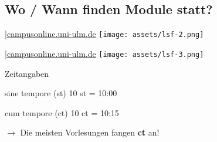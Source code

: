 \documentclass[
	aspectratio=169, 
	10pt 
]{beamer}
\newcommand*\annotatedFigureBoxCustom[8]{\draw[#5,thick,rounded corners] (#1) rectangle (#2);\node at (#4) [fill=#6,thick,shape=circle,draw=#7,inner sep=2pt,font=\sffamily,text=#8] {\textbf{#3}};}
\newcommand*\annotatedFigureBox[4]{\annotatedFigureBoxCustom{#1}{#2}{#3}{#4}{black}{white}{black}{black}}
\newenvironment {annotatedFigure}[1]{\centering\begin{tikzpicture}
    \node[anchor=south west,inner sep=0] (image) at (0,0) { #1};\begin{scope}[x={(image.south east)},y={(image.north west)}]}{\end{scope}\end{tikzpicture}}
\begin{document}
\subsection{Wo / Wann finden Module statt?}


\begin{frame}{\insertsubsection \space|\space\underline{\href{https://campusonline.uni-ulm.de}{campusonline.uni-ulm.de}}}
    \texttt{[image: assets/lsf-2.png]}
\end{frame}

\begin{frame}{\insertsubsection \space|\space\underline{\href{https://campusonline.uni-ulm.de}{campusonline.uni-ulm.de}}}
    \texttt{[image: assets/lsf-3.png]}
\end{frame}

\begin{frame}{Zeitangaben}
    \begin{fancycolumns}
        \begin{definition}{sine tempore (st)}
            10 st = 10:00
        \end{definition}
        \nextcolumn
        \begin{definition}{cum tempore (ct)}
            10 ct = 10:15
        \end{definition}
    \end{fancycolumns}

    $\longrightarrow$ Die meisten Vorlesungen fangen \textbf{ct} an!
\end{frame}
\end{document}
